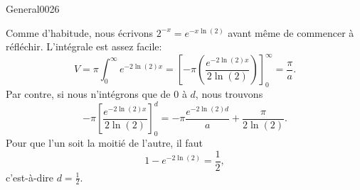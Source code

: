 \begin{corrige}{General0026}

Comme d'habitude, nous écrivons $2^{-x}= e^{-x\ln(2)}$ avant même de commencer à réfléchir. L'intégrale est assez facile:
\begin{equation}
	V=\pi\int_0^{\infty} e^{-2\ln(2)x}=\left[ -\pi\left(  \frac{  e^{-2\ln(2)x} }{ 2\ln(2) } \right) \right]_0^{\infty}=\frac{ \pi }{ a }.
\end{equation}
Par contre, si nous n'intégrons que de $0$ à $d$, nous trouvons
\begin{equation}
	-\pi\left[ \frac{  e^{-2\ln(2)x} }{ 2\ln(2) } \right]_0^d=-\pi\frac{  e^{-2\ln(2)d} }{ a }+\frac{ \pi }{ 2\ln(2) }.
\end{equation}
Pour que l'un soit la moitié de l'autre, il faut
\begin{equation}
	1- e^{-2\ln(2)}=\frac{ 1 }{2},
\end{equation}
c'est-à-dire $d=\frac{1}{ 2 }$.

\end{corrige}
